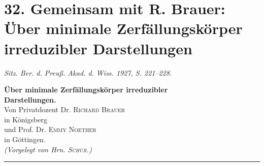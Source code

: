 \section*{32. Gemeinsam mit R. Brauer: Über minimale Zerfällungskörper irreduzibler Darstellungen}
\emph{Sitz. Ber. d. Preuß. Akad. d. Wiss. 1927, S. 221--228.}

\begin{center}
{\Large\bfseries Über minimale Zerfällungskörper irreduzibler\\
Darstellungen.}\\[1.0em]
Von Privatdozent Dr. \textsc{Richard Brauer}\\
in Königsberg\\
und Prof. Dr. \textsc{Emmy Noether}\\
in Göttingen.\\[0.8em]
\emph{(Vorgelegt von Hrn. \textsc{Schur}.)}\\[0.5em]
\rule{4em}{0.4pt}
\end{center}
